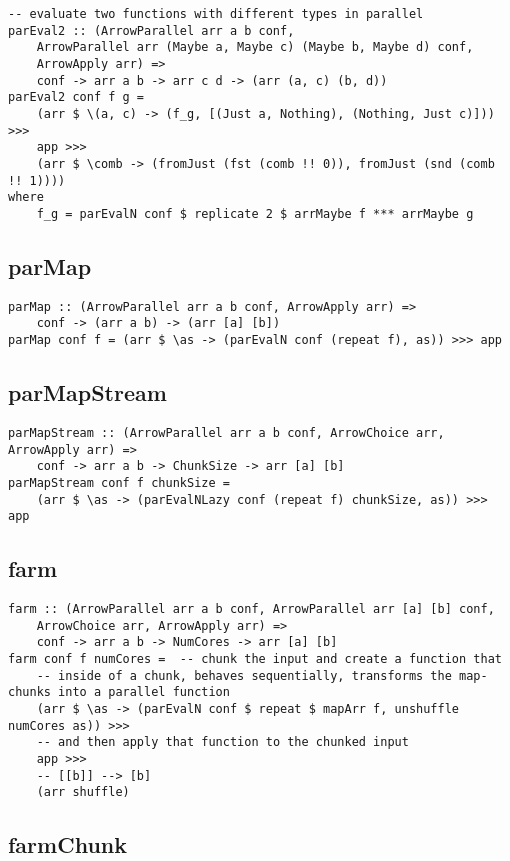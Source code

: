 \begin{lstlisting}[frame=htrbl]
-- evaluate two functions with different types in parallel
parEval2 :: (ArrowParallel arr a b conf,
	ArrowParallel arr (Maybe a, Maybe c) (Maybe b, Maybe d) conf,
	ArrowApply arr) =>
	conf -> arr a b -> arr c d -> (arr (a, c) (b, d))
parEval2 conf f g =
	(arr $ \(a, c) -> (f_g, [(Just a, Nothing), (Nothing, Just c)])) >>>
	app >>>
	(arr $ \comb -> (fromJust (fst (comb !! 0)), fromJust (snd (comb !! 1))))
where
	f_g = parEvalN conf $ replicate 2 $ arrMaybe f *** arrMaybe g
\end{lstlisting}

\subsection{parMap}

\begin{lstlisting}[frame=htrbl]
parMap :: (ArrowParallel arr a b conf, ArrowApply arr) =>
	conf -> (arr a b) -> (arr [a] [b])
parMap conf f = (arr $ \as -> (parEvalN conf (repeat f), as)) >>> app
\end{lstlisting}

\subsection{parMapStream}

\begin{lstlisting}[frame=htrbl]
parMapStream :: (ArrowParallel arr a b conf, ArrowChoice arr, ArrowApply arr) =>
	conf -> arr a b -> ChunkSize -> arr [a] [b]
parMapStream conf f chunkSize =
	(arr $ \as -> (parEvalNLazy conf (repeat f) chunkSize, as)) >>> app
\end{lstlisting}

\subsection{farm}

\begin{lstlisting}[frame=htrbl]
farm :: (ArrowParallel arr a b conf, ArrowParallel arr [a] [b] conf,
	ArrowChoice arr, ArrowApply arr) =>
	conf -> arr a b -> NumCores -> arr [a] [b]
farm conf f numCores =  -- chunk the input and create a function that
	-- inside of a chunk, behaves sequentially, transforms the map-chunks into a parallel function
	(arr $ \as -> (parEvalN conf $ repeat $ mapArr f, unshuffle numCores as)) >>>
	-- and then apply that function to the chunked input
	app >>>
	-- [[b]] --> [b]
	(arr shuffle)
\end{lstlisting}

\subsection{farmChunk}